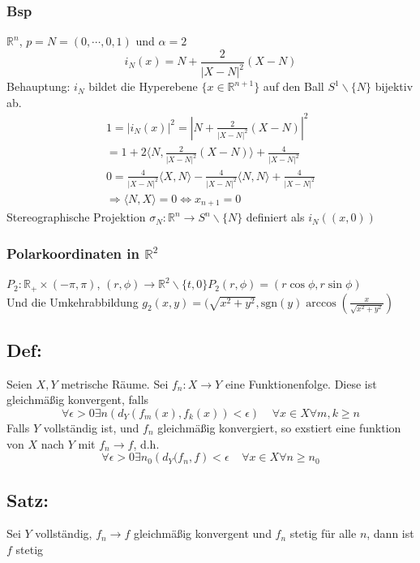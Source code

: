 \subsubsection{Bsp}
$\mathbb R^n$, $p = N = (0,\cdots,0,1)$ und $\alpha = 2$
$$
	i_N(x) = N + \frac{2}{|X-N|^2}(X-N)
$$
Behauptung: $i_N$ bildet die Hyperebene $\{x\in\mathbb R^{n+1}\}$ auf den Ball $S^1\backslash\{N\}$ bijektiv ab.
\begin{gather}
	1 = |i_N(x)|^2 = |N + \frac{2}{|X-N|^2}(X-N)|^2\\
	= 1 + 2\langle N, \frac{2}{|X-N|^2}(X-N)\rangle + \frac{4}{|X-N|^2}\\
	0 = \frac{4}{|X-N|^2}\langle X,N\rangle - \frac{4}{|X-N|^2}\langle N,N\rangle + \frac{4}{|X-N|^2}\\
	\Rightarrow \langle N,X\rangle = 0 \Leftrightarrow x_{n+1} = 0
\end{gather}
Stereographische Projektion
$\sigma_N: \mathbb R^n \rightarrow S^n\backslash\{N\}$ definiert als $i_N((x,0))$

\subsubsection{Polarkoordinaten in $\mathbb R^2$}
$P_2 : \mathbb R_+ \times (-\pi,\pi)$, $(r,\phi)\rightarrow\mathbb R^2\backslash\{t,0\} P_2(r,\phi)=(r\cos\phi, r\sin\phi)$ \\Und die Umkehrabbildung $g_2(x, y) = (\sqrt{x^2 + y^2}, \text{sgn}(y)\arccos(\frac{x}{\sqrt{x^2+y^2}})$

\subsection{Def: }
Seien $X,Y$ metrische Räume. Sei $f_n: X\rightarrow Y$ eine Funktionenfolge. Diese ist gleichmäßig konvergent, falls
\begin{equation}
	\forall\epsilon>0\exists n \left(d_Y(f_m(x), f_k(x)) < \epsilon \right)\;\;\;\; \forall x\in X\forall m,k\geq n
\end{equation}
Falls $Y$ vollständig ist, und $f_n$ gleichmäßig konvergiert, so exstiert eine funktion von $X$ nach $Y$ mit $f_n\rightarrow f$, d.h. $$\forall \epsilon>0\exists n_0 \left(d_Y(f_n, f\right)<\epsilon \;\;\;\; \forall x\in X \forall n\geq n_0$$

\subsection{Satz: }
Sei $Y$ vollständig, $f_n \rightarrow f$ gleichmäßig konvergent und $f_n$ stetig für alle $n$, dann ist $f$ stetig

